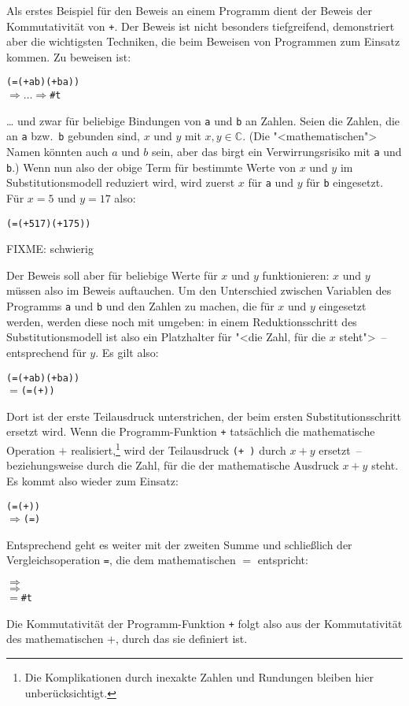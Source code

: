 Als erstes Beispiel für den Beweis an einem Programm dient der Beweis
der Kommutativität von \texttt{+}.  Der Beweis ist nicht besonders
tiefgreifend, demonstriert aber die wichtigsten Techniken, die beim
Beweisen von Programmen zum Einsatz kommen.  Zu beweisen ist:
%
\begin{alltt}
(= (+ a b) (+ b a))
\(\Longrightarrow\ldots\Longrightarrow\) \#t
\end{alltt}
%
\ldots{} und zwar für beliebige Bindungen von \texttt{a} und
\texttt{b} an Zahlen.  Seien die Zahlen, die an \texttt{a} bzw.\
\texttt{b} gebunden sind, $x$ und $y$ mit $x,y\in\mathbb{C}$.  (Die
"<mathematischen"> Namen könnten auch $a$ und $b$ sein, aber das birgt
ein Verwirrungsrisiko mit \texttt{a} und \texttt{b}.)  Wenn nun also
der obige Term für bestimmte Werte von $x$ und $y$ im
Substitutionsmodell reduziert wird, wird zuerst $x$ für \texttt{a} und
$y$ für \texttt{b} eingesetzt.  Für $x=5$ und $y=17$ also:
%
\begin{alltt}
(= (+ 5 17) (+ 17 5))
\end{alltt}
%
FIXME: \valof{\_} schwierig

Der Beweis soll aber für beliebige Werte für $x$ und $y$
funktionieren: $x$ und $y$ müssen also im Beweis auftauchen.
Um den Unterschied zwischen Variablen des Programms \texttt{a} und
\texttt{b} und den Zahlen zu machen, die für $x$ und $y$ eingesetzt
werden, werden diese noch mit \valof{\_} umgeben: \valof{x} in
einem Reduktionsschritt des Substitutionsmodell ist also ein
Platzhalter für "<die Zahl, für die $x$ steht">~-- entsprechend für $y$.
Es gilt also:

\begin{alltt}
(= (+ a b) (+ b a))
\(=\) (=  (+  ))
\end{alltt}
%
Dort ist der erste Teilausdruck unterstrichen, der beim ersten
Substitutionsschritt ersetzt wird.  Wenn die Programm-Funktion
\texttt{+} tatsächlich die mathematische Operation $+$
realisiert,\footnote{Die Komplikationen durch inexakte Zahlen und
  Rundungen bleiben hier unberücksichtigt.}
wird der Teilausdruck \texttt{(+  )} durch $x+y$
ersetzt~-- beziehungsweise durch die Zahl, für die der mathematische
Ausdruck $x+y$ steht.  Es kommt also wieder \valof{\_} zum Einsatz:
%
\begin{alltt}
(=  (+  ))
\(\Longrightarrow\) (=  )
\end{alltt}
%
Entsprechend geht es weiter mit der zweiten Summe und schließlich der
Vergleichsoperation \texttt{=}, die dem mathematischen $=$ entspricht:
%
\begin{alltt}
\(\Longrightarrow\) 
\(\Longrightarrow\) 
\(=\) \#t
\end{alltt}
%
Die Kommutativität der Programm-Funktion \texttt{+} folgt also aus der
Kommutativität des mathematischen $+$, durch das sie definiert ist.

